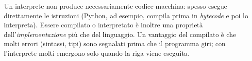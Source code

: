 \documentclass[11pt,a4paper]{article}
\begin{document}
\begin{osservazione}
Un interprete non produce necessariamente codice macchina: spesso esegue direttamente le istruzioni (Python, ad esempio, compila prima in \emph{bytecode} e poi lo interpreta). Essere compilato o interpretato è inoltre una proprietà dell'\emph{implementazione} più che del linguaggio. Un vantaggio del compilato è che molti errori (sintassi, tipi) sono segnalati prima che il programma giri; con l'interprete molti emergono solo quando la riga viene eseguita.
\end{osservazione}
\end{document}
